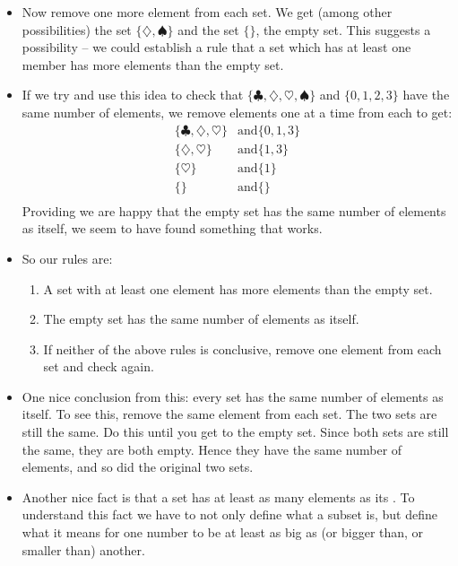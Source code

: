 \begin{itemize}
\item
Now remove one more element from each set. We get (among other possibilities) the set $\{\diamondsuit, \spadesuit\}$ and the set $\{\}$, the empty set. This suggests a possibility -- we could establish a rule that a set which has at least one member has more elements than the empty set.
\item
If we try and use this idea to check that $\{\clubsuit, \diamondsuit, \heartsuit, \spadesuit\}$ and $\{0,1,2,3\}$ have the same number of elements, we remove elements one at a time from each to get:
\begin{align*}
\{\clubsuit, \diamondsuit, \heartsuit\} &\text{and} \{0,1,3\} \\
\{\diamondsuit, \heartsuit\} &\text{and} \{1,3\} \\
\{\heartsuit\} &\text{and} \{1\} \\
\{\} &\text{and} \{\} \\
\end{align*}
Providing we are happy that the empty set has the same number of elements as itself, we seem to have found something that works.
\item
So our rules are:
\begin{enumerate}[I]
\item
A set with at least one element has more elements than the empty set.
\item
The empty set has the same number of elements as itself.
\item
If neither of the above rules is conclusive, remove one element from each set and check again.
\end{enumerate}
\item
One nice conclusion from this: every set has the same number of elements as itself. To see this, remove the same element from each set. The two sets are still the same. Do this until you get to the empty set. Since both sets are still the same, they are both empty. Hence they have the same number of elements, and so did the original two sets.
\item
Another nice fact is that a set has at least as many elements as its . To understand this fact we have to not only define what a subset is, but define what it means for one number to be at least as big as (or bigger than, or smaller than) another. 
\end{itemize}

\theendnotes
